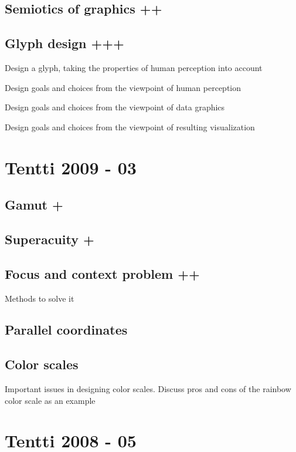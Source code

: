 \documentclass[a4paper]{article}
\begin{document}
\subsection{Semiotics of graphics ++}

\subsection{Glyph design +++}

Design a glyph, taking the properties of human perception into account

Design goals and choices from the viewpoint of human perception

Design goals and choices from the viewpoint of data graphics

Design goals and choices from the viewpoint of resulting visualization



\section{Tentti 2009 - 03}

\subsection{Gamut +}

\subsection{Superacuity +}

\subsection{Focus and context problem ++}

Methods to solve it

\subsection{Parallel coordinates}

\subsection{Color scales}

Important issues in designing color scales. Discuss pros and cons of the rainbow color scale as an example

\section{Tentti 2008 - 05}
\end{document}
